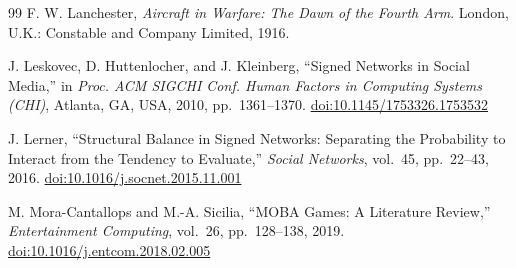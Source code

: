 \begin{thebibliography}{99}
F. W. Lanchester, \textit{Aircraft in Warfare: The Dawn of the Fourth Arm}.
London, U.K.: Constable and Company Limited, 1916.

J. Leskovec, D. Huttenlocher, and J. Kleinberg,
``Signed Networks in Social Media,''
in \textit{Proc. ACM SIGCHI Conf. Human Factors in Computing Systems (CHI)},
Atlanta, GA, USA, 2010, pp.~1361--1370.
\href{https://doi.org/10.1145/1753326.1753532}{doi:10.1145/1753326.1753532}

J. Lerner,
``Structural Balance in Signed Networks: Separating the Probability to Interact
from the Tendency to Evaluate,''
\textit{Social Networks}, vol.~45, pp.~22--43, 2016.
\href{https://doi.org/10.1016/j.socnet.2015.11.001}{doi:10.1016/j.socnet.2015.11.001}

M. Mora-Cantallops and M.-A. Sicilia,
``MOBA Games: A Literature Review,''
\textit{Entertainment Computing}, vol.~26, pp.~128--138, 2019.
\href{https://doi.org/10.1016/j.entcom.2018.02.005}{doi:10.1016/j.entcom.2018.02.005}

\end{thebibliography}
